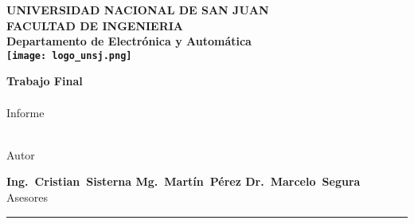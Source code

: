 \begin{titlepage}
  \begin{center}
    \begin{Large}
      \textbf{UNIVERSIDAD NACIONAL DE SAN JUAN\\
      \vspace*{0.05in}
      FACULTAD DE INGENIERIA\\
      \vspace*{0.05in}
      Departamento de Electrónica y Automática\\
      \vspace*{0.2in}
      \texttt{[image: logo\_unsj.png]}\\
      \vspace*{\fill}}
    \end{Large}
    \begin{Large}
      \textbf{Trabajo Final\\\MakeUppercase{\thetitle}} \\
      Informe\\
    \end{Large}
    \vspace*{\fill}
    \begin{large}
      \textbf{\theauthor}\\
      Autor\\
    \end{large}
    \vspace*{0.5in}
    \begin{large}
      \textbf{Ing.~Cristian~Sisterna \hspace*{\fill}
      Mg.~Martín~Pérez \hspace*{\fill} Dr.~Marcelo~Segura \\}
      Asesores\\
    \end{large}
    \vspace{\fill}
    \rule{80mm}{0.1mm}\\
    \vspace{.1in}
    \the\year
  \end{center}

\end{titlepage}
